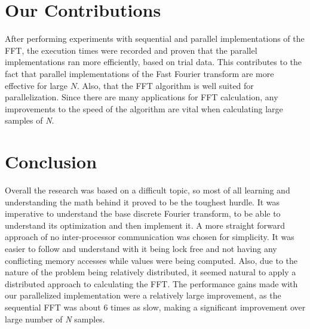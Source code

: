 \documentclass[journal]{IEEEtran}
\begin{document}
\section{Our Contributions}
	\par{
		After performing experiments with sequential and parallel implementations of the FFT, the execution times were 
		recorded and proven that the parallel implementations ran more efficiently, based on trial data. This contributes to the fact 
		that parallel implementations of the Fast Fourier transform are more effective for large $N$. Also, that the FFT algorithm 
		is well suited for parallelization. Since there are many applications for FFT calculation, any improvements to the speed 
		of the algorithm are vital when calculating large samples of \textit{N}.
	}
\section{Conclusion}
	\par{
		Overall the research was based on a difficult topic, so most of all learning and understanding the 
		math behind it proved to be the toughest hurdle. It was imperative to understand the base discrete 
		Fourier transform, to be able to understand its optimization and then implement it. A more straight 
		forward approach of no inter-processor communication was chosen for simplicity. It was easier to 
		follow and understand with it being lock free and not having any conflicting memory accesses while 
		values were being computed. Also, due to the nature of the problem being relatively distributed, it 
		seemed natural to apply a distributed approach to calculating the FFT. The performance gains made 
		with our parallelized implementation were a relatively large improvement, as the sequential FFT was 
		about 6 times as slow, making a significant improvement over large number of \textit{N} samples.
	}
\pagebreak

\medskip


\end{document}
